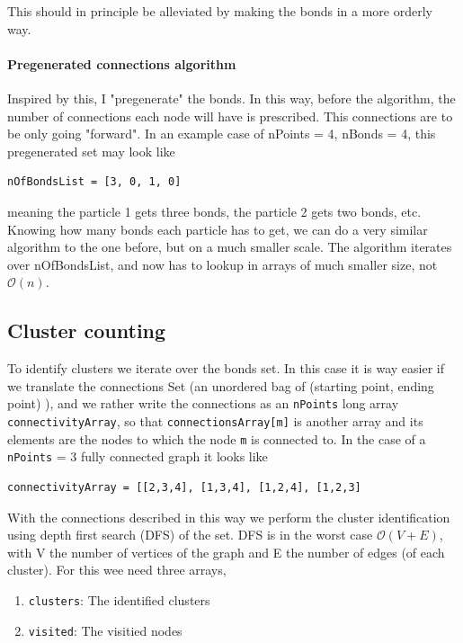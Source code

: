 This should in principle be alleviated by making the bonds in a more orderly way.
\paragraph{Pregenerated connections algorithm}

Inspired by this, I "pregenerate" the bonds. In this way, before the algorithm, the number of connections each node will have is prescribed. This connections are to be only going "forward". In an example case of nPoints = 4, nBonds = 4, this pregenerated set may look like
\begin{lstlisting}
nOfBondsList = [3, 0, 1, 0]
\end{lstlisting}
meaning the particle 1 gets three bonds, the particle 2 gets two bonds, etc.
Knowing how many bonds each particle has to get, we can do a very similar algorithm to the one before, but on a much smaller scale. The algorithm iterates over nOfBondsList, and now has to lookup in arrays of much smaller size, not $\mathcal{O}(n)$. 



\subsection{Cluster counting}

To identify clusters we iterate over the bonds set. In this case it is way easier if we translate the connections Set (an unordered bag of (starting point, ending point) ), and we rather write the connections as an \texttt{nPoints} long array \texttt{connectivityArray}, so that  \texttt{connectionsArray[m]} is another array and its elements are the nodes to which the node \texttt{m} is connected to. In the case of a \texttt{nPoints} = 3 fully  connected graph it looks like 
\begin{lstlisting}
connectivityArray = [[2,3,4], [1,3,4], [1,2,4], [1,2,3]	
\end{lstlisting}

With the connections described in this way we perform the cluster identification using depth first search (DFS) of the set. DFS is in the worst case $\mathcal{O}(V + E)$, with V the number of vertices of the graph and E the number of edges (of each cluster). For this wee need three arrays,
\begin{enumerate}
	\item \texttt{clusters}: The identified clusters
	\item \texttt{visited}: The visitied nodes
\end{enumerate}

